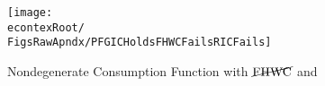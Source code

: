 \begin{figure}
\centerline{\texttt{[image: \\econtexRoot/\\FigsRawApndx/PFGICHoldsFHWCFailsRICFails]}}
\caption{Nondegenerate Consumption Function with $\cancel{\mbox{FHWC}}$ and \cncl{\RIC}}
\label{fig:PFGICHoldsFHWCFailsRICFails}
\end{figure}

